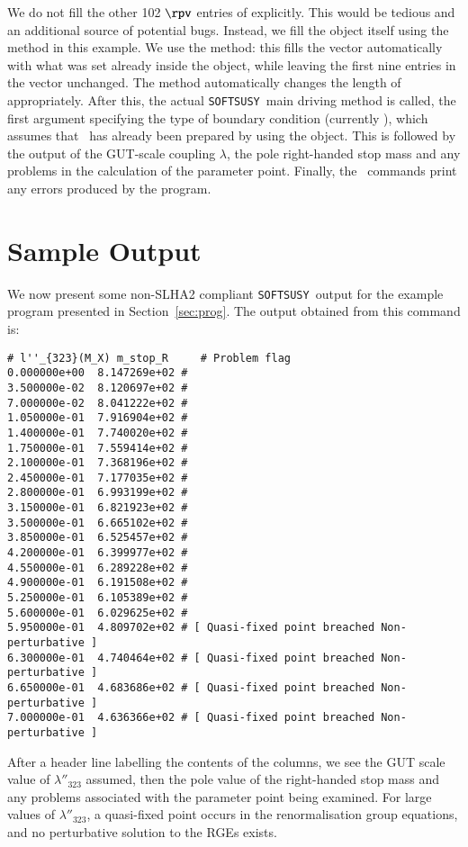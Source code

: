 \documentclass[final,3p,times,pdflatex]{elsarticle}
\def\SOFTSUSY{{\tt SOFTSUSY}}
\begin{document}
We do not fill the other 102 $\rpv$ entries
of  explicitly. This would be tedious and an additional
source of potential bugs. Instead, we fill the  object
itself using the  method in this example.  
We use the  method: this fills the
 vector automatically with what was set already inside the
 object, while leaving the first nine entries in the
vector unchanged. The  method automatically changes the length
of  appropriately. 
After this, the actual \SOFTSUSY~main driving method  is
called, the first argument specifying the type of boundary condition 
(currently ), which assumes that ~has already
been prepared by using the  object. 
This is followed by the output of the GUT-scale coupling $\lambda$, 
the pole right-handed stop mass and any problems in the calculation of the
parameter point.  Finally, the ~commands print any errors produced
by the program.


\section{Sample Output \label{sec:output}}

We now present some non-SLHA2 compliant \SOFTSUSY~output
for the example program presented in Section~\ref{sec:prog}.
\normalsize
The output obtained from this command is:
\small
\begin{verbatim}
# l''_{323}(M_X) m_stop_R     # Problem flag
0.000000e+00  8.147269e+02 # 
3.500000e-02  8.120697e+02 # 
7.000000e-02  8.041222e+02 # 
1.050000e-01  7.916904e+02 # 
1.400000e-01  7.740020e+02 # 
1.750000e-01  7.559414e+02 # 
2.100000e-01  7.368196e+02 # 
2.450000e-01  7.177035e+02 # 
2.800000e-01  6.993199e+02 # 
3.150000e-01  6.821923e+02 # 
3.500000e-01  6.665102e+02 # 
3.850000e-01  6.525457e+02 # 
4.200000e-01  6.399977e+02 # 
4.550000e-01  6.289228e+02 # 
4.900000e-01  6.191508e+02 # 
5.250000e-01  6.105389e+02 # 
5.600000e-01  6.029625e+02 # 
5.950000e-01  4.809702e+02 # [ Quasi-fixed point breached Non-perturbative ]
6.300000e-01  4.740464e+02 # [ Quasi-fixed point breached Non-perturbative ]
6.650000e-01  4.683686e+02 # [ Quasi-fixed point breached Non-perturbative ]
7.000000e-01  4.636366e+02 # [ Quasi-fixed point breached Non-perturbative ]
\end{verbatim}
\normalsize
After a header line labelling the contents of the columns, we see the GUT
scale value of $\lambda''_{323}$ assumed, then the pole value of the
right-handed stop mass and any problems associated with the parameter point
being examined. For large values of $\lambda''_{323}$, a quasi-fixed point
occurs in the renormalisation group equations, and no perturbative solution to
the RGEs exists. 
\end{document}
